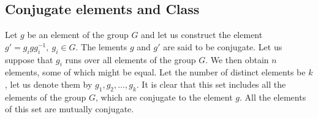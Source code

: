 
\subsection{Conjugate elements and Class} %
\label{sub:Conjugate elements and Class}

Let $g$ be an element of the group $G$ and let us construct the element
$g'=g_igg_i^{-1},\ g_i\in G$. The lements $g$ and $g'$ are said to be conjugate.
Let us suppose that $g_i$ runs over all elements of the group $G$. We then obtain
$n$ elements, some of which might be equal. Let the number of distinct elements
be $k$, let us denote them by $g_1,g_2,\dots,g_k$. It is clear that this set
includes all the elements of the group $G$, which are conjugate to the element
$g$. All the elements of this set are mutually conjugate.

